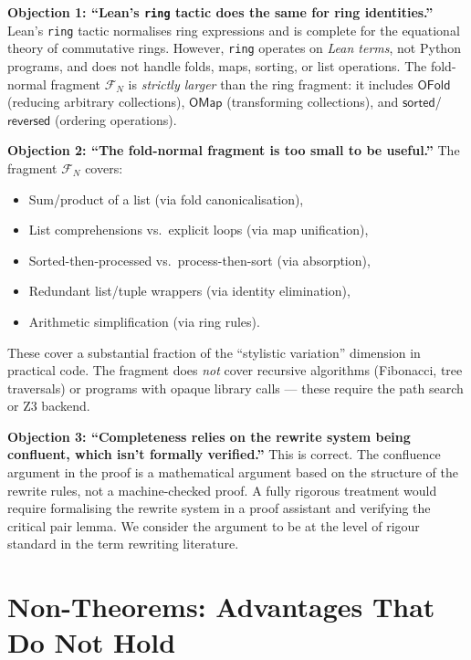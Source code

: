 \begin{remark}
\label{rem:adv-normalizer}
\textbf{Objection 1: ``Lean's \texttt{ring} tactic does the same for
ring identities.''}  Lean's \texttt{ring} tactic normalises ring
expressions and is complete for the equational theory of commutative
rings.  However, \texttt{ring} operates on \emph{Lean terms}, not
Python programs, and does not handle folds, maps, sorting, or list
operations.  The fold-normal fragment $\mathcal{F}_N$ is
\emph{strictly larger} than the ring fragment: it includes
$\mathsf{OFold}$ (reducing arbitrary collections),
$\mathsf{OMap}$ (transforming collections), and
$\mathsf{sorted}$/$\mathsf{reversed}$ (ordering operations).

\textbf{Objection 2: ``The fold-normal fragment is too small to be
useful.''}  The fragment $\mathcal{F}_N$ covers:
\begin{itemize}
  \item Sum/product of a list (via fold canonicalisation),
  \item List comprehensions vs.\ explicit loops (via map unification),
  \item Sorted-then-processed vs.\ process-then-sort (via absorption),
  \item Redundant list/tuple wrappers (via identity elimination),
  \item Arithmetic simplification (via ring rules).
\end{itemize}
These cover a substantial fraction of the ``stylistic variation''
dimension in practical code.  The fragment does \emph{not} cover
recursive algorithms (Fibonacci, tree traversals) or programs with
opaque library calls — these require the path search or Z3 backend.

\textbf{Objection 3: ``Completeness relies on the rewrite system
being confluent, which isn't formally verified.''}  This is correct.
The confluence argument in the proof is a mathematical argument based
on the structure of the rewrite rules, not a machine-checked proof.
A fully rigorous treatment would require formalising the rewrite
system in a proof assistant and verifying the critical pair lemma.
We consider the argument to be at the level of rigour standard in
the term rewriting literature.
\end{remark}


\section{Non-Theorems: Advantages That Do Not Hold}
\label{sec:non-theorems}

